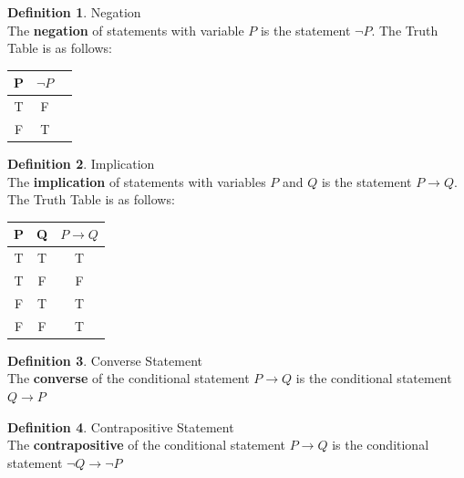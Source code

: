 \documentclass{book}
\theoremstyle{definition}
\newtheorem{definition}{Definition}[section]
\theoremstyle{remark}
\begin{document}
\begin{definition}
Negation \\

The {\bf negation} of statements with variable $P$ is the statement $\neg P$. The Truth Table is as follows: \\
\begin{center}
\begin{tabular}{|c|c|c|}
\hline 
P & $\neg P$ \\ 
\hline 
T & F \\ 
\hline 
F & T \\ 
\hline 
\end{tabular} 
\end{center}
\end{definition}


\begin{definition}
Implication \\

The {\bf implication} of statements with variables $P$ and $Q$ is the statement $P \to Q$. The Truth Table is as follows: \\
\begin{center}
\begin{tabular}{|c|c|c|}
\hline 
P & Q & $P \to Q$ \\ 
\hline 
T & T & T \\ 
\hline 
T & F & F \\ 
\hline 
F & T & T \\ 
\hline 
F & F & T \\ 
\hline 
\end{tabular} 
\end{center}
\end{definition}

\begin{definition}
Converse Statement \\

The {\bf converse} of the conditional statement $P \to Q$ is the conditional statement $Q \to P$
\end{definition}

\begin{definition}
Contrapositive Statement \\

The {\bf contrapositive} of the conditional statement $P \to Q$ is the conditional statement $\neg Q \to \neg P$
\end{definition}
\end{document}

